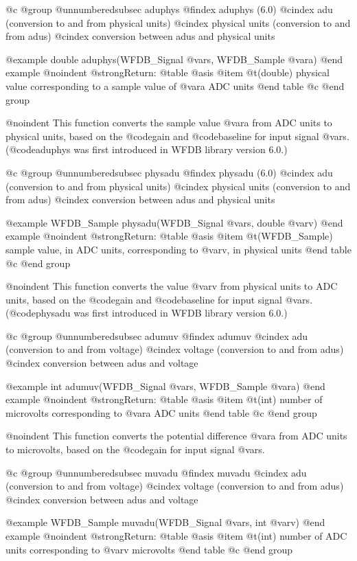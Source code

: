 {{{{{{{{{@c @group
@unnumberedsubsec aduphys
@findex aduphys (6.0)
@cindex adu (conversion to and from physical units)
@cindex physical units (conversion to and from adus)
@cindex conversion between adus and physical units

@example
double aduphys(WFDB_Signal @var{s}, WFDB_Sample @var{a})
@end example
@noindent
@strong{Return:}
@table @asis
@item @t{(double)}
physical value corresponding to a sample value of @var{a} ADC units
@end table
@c @end group

@noindent
This function converts the sample value @var{a} from ADC units to
physical units, based on the @code{gain} and @code{baseline} for input
signal @var{s}.  (@code{aduphys} was first introduced in WFDB library
version 6.0.)

@c @group
@unnumberedsubsec physadu
@findex physadu (6.0)
@cindex adu (conversion to and from physical units)
@cindex physical units (conversion to and from adus)
@cindex conversion between adus and physical units

@example
WFDB_Sample physadu(WFDB_Signal @var{s}, double @var{v})
@end example
@noindent
@strong{Return:}
@table @asis
@item @t{(WFDB_Sample)}
sample value, in ADC units, corresponding to @var{v}, in physical units
@end table
@c @end group

@noindent
This function converts the value @var{v} from physical units to ADC
units, based on the @code{gain} and @code{baseline} for input signal
@var{s}.  (@code{physadu} was first introduced in WFDB library version
6.0.)

@c @group
@unnumberedsubsec adumuv
@findex adumuv
@cindex adu (conversion to and from voltage)
@cindex voltage (conversion to and from adus)
@cindex conversion between adus and voltage

@example
int adumuv(WFDB_Signal @var{s}, WFDB_Sample @var{a})
@end example
@noindent
@strong{Return:}
@table @asis
@item @t{(int)}
number of microvolts corresponding to @var{a} ADC units
@end table
@c @end group

@noindent
This function converts the potential difference @var{a} from ADC units to
microvolts, based on the @code{gain} for input signal @var{s}.

@c @group
@unnumberedsubsec muvadu
@findex muvadu
@cindex adu (conversion to and from voltage)
@cindex voltage (conversion to and from adus)
@cindex conversion between adus and voltage

@example
WFDB_Sample muvadu(WFDB_Signal @var{s}, int @var{v})
@end example
@noindent
@strong{Return:}
@table @asis
@item @t{(int)}
number of ADC units corresponding to @var{v} microvolts
@end table
@c @end group

}}}}}}}}}
